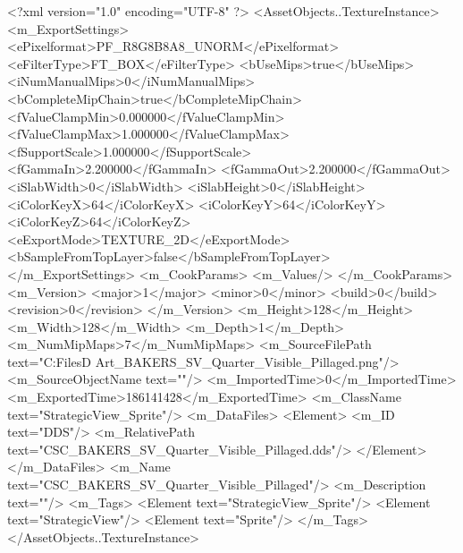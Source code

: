 <?xml version="1.0" encoding="UTF-8" ?>
<AssetObjects..TextureInstance>
	<m_ExportSettings>
		<ePixelformat>PF_R8G8B8A8_UNORM</ePixelformat>
		<eFilterType>FT_BOX</eFilterType>
		<bUseMips>true</bUseMips>
		<iNumManualMips>0</iNumManualMips>
		<bCompleteMipChain>true</bCompleteMipChain>
		<fValueClampMin>0.000000</fValueClampMin>
		<fValueClampMax>1.000000</fValueClampMax>
		<fSupportScale>1.000000</fSupportScale>
		<fGammaIn>2.200000</fGammaIn>
		<fGammaOut>2.200000</fGammaOut>
		<iSlabWidth>0</iSlabWidth>
		<iSlabHeight>0</iSlabHeight>
		<iColorKeyX>64</iColorKeyX>
		<iColorKeyY>64</iColorKeyY>
		<iColorKeyZ>64</iColorKeyZ>
		<eExportMode>TEXTURE_2D</eExportMode>
		<bSampleFromTopLayer>false</bSampleFromTopLayer>
	</m_ExportSettings>
	<m_CookParams>
		<m_Values/>
	</m_CookParams>
	<m_Version>
		<major>1</major>
		<minor>0</minor>
		<build>0</build>
		<revision>0</revision>
	</m_Version>
	<m_Height>128</m_Height>
	<m_Width>128</m_Width>
	<m_Depth>1</m_Depth>
	<m_NumMipMaps>7</m_NumMipMaps>
	<m_SourceFilePath text="C:\Users\Shadow\Desktop\Working Files\2D Art\Quarters\Bakers\StrategicView\CSC_BAKERS_SV_Quarter_Visible_Pillaged.png"/>
	<m_SourceObjectName text=""/>
	<m_ImportedTime>0</m_ImportedTime>
	<m_ExportedTime>186141428</m_ExportedTime>
	<m_ClassName text="StrategicView_Sprite"/>
	<m_DataFiles>
		<Element>
			<m_ID text="DDS"/>
			<m_RelativePath text="CSC_BAKERS_SV_Quarter_Visible_Pillaged.dds"/>
		</Element>
	</m_DataFiles>
	<m_Name text="CSC_BAKERS_SV_Quarter_Visible_Pillaged"/>
	<m_Description text=""/>
	<m_Tags>
		<Element text="StrategicView_Sprite"/>
		<Element text="StrategicView"/>
		<Element text="Sprite"/>
	</m_Tags>
</AssetObjects..TextureInstance>

